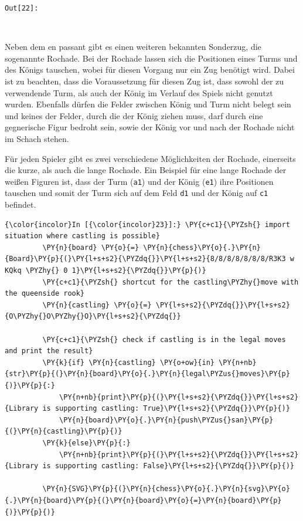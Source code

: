 \texttt{\color{outcolor}Out[{\color{outcolor}22}]:}
    
    \begin{center}
    \end{center}
    { \hspace*{\fill} \\}
    

    Neben dem en passant gibt es einen weiteren bekannten Sonderzug, die
sogenannte Rochade. Bei der Rochade lassen sich die Positionen eines
Turms und des Königs tauschen, wobei für diesen Vorgang nur ein Zug
benötigt wird. Dabei ist zu beachten, dass die Voraussetzung für diesen
Zug ist, dass sowohl der zu verwendende Turm, als auch der König im
Verlauf des Spiels nicht genutzt wurden. Ebenfalls dürfen die Felder
zwischen König und Turm nicht belegt sein und keines der Felder, durch
die der König ziehen muss, darf durch eine gegnerische Figur bedroht
sein, sowie der König vor und nach der Rochade nicht im Schach stehen.

Für jeden Spieler gibt es zwei verschiedene Möglichkeiten der Rochade,
einerseits die kurze, als auch die lange Rochade. Ein Beispiel für eine
lange Rochade der weißen Figuren ist, dass der Turm (\texttt{a1}) und
der König (\texttt{e1}) ihre Positionen tauschen und somit der Turm sich
auf dem Feld \texttt{d1} und der König auf \texttt{c1} befindet.

    \begin{Verbatim}[commandchars=\\\{\}]
{\color{incolor}In [{\color{incolor}23}]:} \PY{c+c1}{\PYZsh{} import situation where castling is possible}
         \PY{n}{board} \PY{o}{=} \PY{n}{chess}\PY{o}{.}\PY{n}{Board}\PY{p}{(}\PY{l+s+s2}{\PYZdq{}}\PY{l+s+s2}{8/8/8/8/8/8/8/R3K3 w KQkq \PYZhy{} 0 1}\PY{l+s+s2}{\PYZdq{}}\PY{p}{)}
         \PY{c+c1}{\PYZsh{} shortcut for the castling\PYZhy{}move with the queenside rook}
         \PY{n}{castling} \PY{o}{=} \PY{l+s+s2}{\PYZdq{}}\PY{l+s+s2}{O\PYZhy{}O\PYZhy{}O}\PY{l+s+s2}{\PYZdq{}}
         
         \PY{c+c1}{\PYZsh{} check if castling is in the legal moves and print the result}
         \PY{k}{if} \PY{n}{castling} \PY{o+ow}{in} \PY{n+nb}{str}\PY{p}{(}\PY{n}{board}\PY{o}{.}\PY{n}{legal\PYZus{}moves}\PY{p}{)}\PY{p}{:}
             \PY{n+nb}{print}\PY{p}{(}\PY{l+s+s2}{\PYZdq{}}\PY{l+s+s2}{Library is supporting castling: True}\PY{l+s+s2}{\PYZdq{}}\PY{p}{)}
             \PY{n}{board}\PY{o}{.}\PY{n}{push\PYZus{}san}\PY{p}{(}\PY{n}{castling}\PY{p}{)}
         \PY{k}{else}\PY{p}{:}
             \PY{n+nb}{print}\PY{p}{(}\PY{l+s+s2}{\PYZdq{}}\PY{l+s+s2}{Library is supporting castling: False}\PY{l+s+s2}{\PYZdq{}}\PY{p}{)}
         
         \PY{n}{SVG}\PY{p}{(}\PY{n}{chess}\PY{o}{.}\PY{n}{svg}\PY{o}{.}\PY{n}{board}\PY{p}{(}\PY{n}{board}\PY{o}{=}\PY{n}{board}\PY{p}{)}\PY{p}{)} 
\end{Verbatim}


